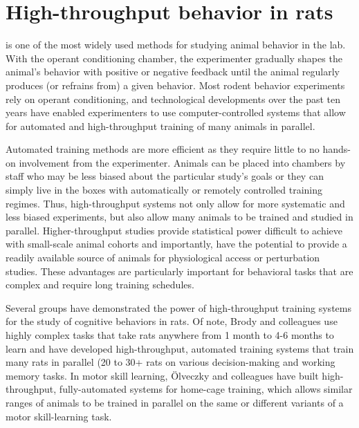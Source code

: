 
\chapter{High-throughput behavior in rats}

 is one of the most widely used methods for studying animal behavior in the lab. With the operant conditioning chamber, the experimenter gradually shapes the animal's behavior with positive or negative feedback until the animal regularly produces (or refrains from) a given behavior. Most rodent behavior experiments rely on operant conditioning, and technological developments over the past ten years have enabled experimenters to use computer-controlled systems that allow for automated and high-throughput training of many animals in parallel. 

Automated training methods are more efficient as they require little to no hands-on involvement from the experimenter. Animals can be placed into chambers by staff who may be less biased about the particular study's goals or they can simply live in the boxes with automatically or remotely controlled training regimes\cite{Qiao2018, Miller2017TwoStep, Poddar2013}. Thus, high-throughput systems not only allow for more systematic and less biased experiments, but also allow many animals to be trained and studied in parallel. Higher-throughput studies provide statistical power difficult to achieve with small-scale animal cohorts and importantly, have the potential to provide a readily available source of animals for physiological access or perturbation studies. These advantages are particularly important for behavioral tasks that are complex and require long training schedules.

Several groups have demonstrated the power of high-throughput training systems for the study of cognitive behaviors in rats. Of note, Brody and colleagues use highly complex tasks that take rats anywhere from 1 month to 4-6 months to learn\cite{Brunton2013, Miller2017TwoStep, Constantinople2019} and have developed high-throughput, automated training systems that train many rats in parallel (20 to 30+ rats\cite{Brunton2013, Constantinople2019} on various decision-making and working memory tasks\cite{Miller2017TwoStep, Brunton2013}. In motor skill learning, {\"O}lveczky and colleagues have built high-throughput, fully-automated systems for home-cage training, which allows similar ranges of animals to be trained in parallel on the same or different variants of a motor skill-learning task\cite{Poddar2013}. 


